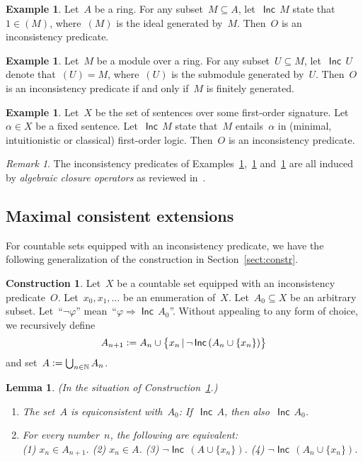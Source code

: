 \documentclass[com,11pt,crcready]{iosart2x}
\theoremstyle{definition}
\newtheorem{construction}{Construction}[section]
\newtheorem{example}[definition]{Example}
\theoremstyle{plain}
\newtheorem{lemma}[definition]{Lemma}
\theoremstyle{remark}
\newtheorem{remark}[definition]{Remark}
\newcommand{\Incbare}{\mathsf{Inc}}
\newcommand{\Inc}[1]{\operatorname{\Incbare}\,#1}
\newcommand{\?}{\,{:}\,}
\newcommand{\NN}{\mathbb{N}}
\newcommand{\defeq}{\vcentcolon=}
\renewcommand{\_}{\mathpunct{.}\,}
\begin{document}
\begin{example}\label{ex:inc-ring}Let~$A$ be a ring. For any subset~$M \subseteq A$, let~$\Inc{M}$
state that~$1 \in (M)$, where~$(M)$ is the ideal generated by~$M$. Then~$O$ is an
inconsistency predicate.\end{example}

\begin{example}\label{ex:inc-module}Let~$M$ be a module over a ring. For any subset~$U \subseteq M$,
let~$\Inc{U}$ denote that~$(U) = M$, where~$(U)$ is the submodule generated
by~$U$. Then~$O$ is an inconsistency predicate if and
only if~$M$ is finitely generated.\end{example}

\begin{example}\label{ex:inc-formulas}Let~$X$ be the set of sentences over some first-order
signature. Let~$\alpha \in X$ be a fixed sentence. Let~$\Inc{M}$ state that~$M$
entails~$\alpha$ in (minimal, intuitionistic or classical) first-order logic. Then~$O$ is an inconsistency
predicate.\end{example}

\begin{remark}The inconsistency predicates of
Examples~\ref{ex:inc-ring},~\ref{ex:inc-module} and~\ref{ex:inc-formulas} are
all induced by \emph{algebraic closure operators} as reviewed
in~\cite[Example~1]{wessel-schuster:radical}.\end{remark}


\subsection{Maximal consistent extensions}

For countable sets equipped with an inconsistency predicate, we have the
following generalization of the construction in Section~\ref{sect:constr}.

\begin{construction}\label{constr:inc}Let~$X$ be a countable set equipped with
an inconsistency predicate~$O$. Let~$x_0,x_1,\ldots$ be an enumeration of~$X$.
Let~$A_0 \subseteq X$ be an arbitrary subset. Let~``$\neg\varphi$''
mean~``$\varphi \Rightarrow \Inc{A_0}$''. Without appealing to any form of choice,
we recursively define
\[ A_{n+1} \defeq A_n \cup \bigl\{ x_n \,|\, \neg \Inc{(A_n\cup\{x_n\})} \bigr\} \]
and set~$A \defeq \bigcup_{n \in \NN} A_n$.
\end{construction}

\begin{lemma}\label{lemma:omnibus-inc}(In the situation of
Construction~\ref{constr:inc}.)
\begin{enumerate}
\item[(a)] The set~$A$ is equiconsistent with~$A_0$: If~$\Inc{A}$, then also~$\Inc{A_0}$.
\item[(b)] For every number~$n$, the following are equivalent: \\
(1) $x_n \in A_{n+1}$. \quad
(2) $x_n \in A$. \quad
(3) $\neg \Inc{(A\cup\{x_n\})}$. \quad
(4) $\neg \Inc{(A_n \cup \{x_n\})}$.
\end{enumerate}\end{lemma}
\end{document}
